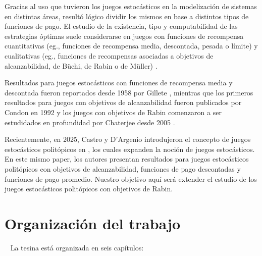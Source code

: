 
Gracias al uso que tuvieron los juegos estocásticos en la modelización de
sistemas en distintas áreas, resultó lógico dividir los mismos en base a
distintos tipos de funciones de pago. El estudio de la existencia, tipo y
computabilidad de las estrategias óptimas suele considerarse en juegos con
funciones de recompensa cuantitativas (eg., funciones de recompensa media,
descontada, pesada o límite) y cualitativas (eg., funciones de recompensas
asociadas a objetivos de alcanzabilidad, de Büchi, de Rabin o de Müller)
\cite{Chatterjee2007,Kučera2011,Chatterjee1}.

Resultados para juegos estocásticos con funciones de recompensa media y
descontada fueron reportados desde 1958 por Gillete \cite{Gillette1958},
mientras que los primeros resultados para juegos con objetivos de
alcanzabilidad fueron publicados por Condon en 1992 \cite{CONDON1992} y los
juegos con objetivos de Rabin comenzaron a ser estudidados en profundidad por
Chaterjee desde 2005 \cite{ComplexityRabin,Chatterjee2007,Chatterjee1}.

Recientemente, en 2025, Castro y D'Argenio introdujeron el concepto de juegos
estocásticos politópicos en \cite{Polytopal}, los cuales expanden la noción de
juegos estocásticos.
En este mismo paper, los autores presentan resultados para juegos estocásticos
politópicos con objetivos de alcanzabilidad, funciones de pago descontadas y
funciones de pago promedio. Nuestro objetivo aquí será extender el estudio de
los juegos estocásticos politópicos con objetivos de Rabin.

\section{Organización del trabajo}
~\label{cap:intro:sec:outline}
La tesina está organizada en seis capítulos:

